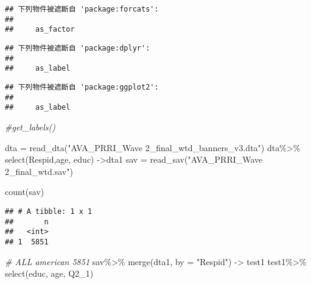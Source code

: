 \documentclass[
]{article}
\newenvironment{Shaded}{\begin{snugshade}}{\end{snugshade}}
\newcommand{\AttributeTok}[1]{\textcolor[rgb]{0.77,0.63,0.00}{#1}}
\newcommand{\CommentTok}[1]{\textcolor[rgb]{0.56,0.35,0.01}{\textit{#1}}}
\newcommand{\FunctionTok}[1]{\textcolor[rgb]{0.00,0.00,0.00}{#1}}
\newcommand{\NormalTok}[1]{#1}
\newcommand{\OtherTok}[1]{\textcolor[rgb]{0.56,0.35,0.01}{#1}}
\newcommand{\SpecialCharTok}[1]{\textcolor[rgb]{0.00,0.00,0.00}{#1}}
\newcommand{\StringTok}[1]{\textcolor[rgb]{0.31,0.60,0.02}{#1}}
\begin{document}
\begin{verbatim}
## 下列物件被遮斷自 'package:forcats':
## 
##     as_factor
\end{verbatim}

\begin{verbatim}
## 下列物件被遮斷自 'package:dplyr':
## 
##     as_label
\end{verbatim}

\begin{verbatim}
## 下列物件被遮斷自 'package:ggplot2':
## 
##     as_label
\end{verbatim}

\begin{Shaded}
\begin{Highlighting}[]
\CommentTok{\#get\_labels()}
\end{Highlighting}
\end{Shaded}

\begin{Shaded}
\begin{Highlighting}[]
\NormalTok{dta }\OtherTok{=} \FunctionTok{read\_dta}\NormalTok{(}\StringTok{"AVA\_PRRI\_Wave 2\_final\_wtd\_banners\_v3.dta"}\NormalTok{)}
\NormalTok{dta}\SpecialCharTok{\%\textgreater{}\%}
  \FunctionTok{select}\NormalTok{(Respid,age, educ) }\OtherTok{{-}\textgreater{}}\NormalTok{dta1}
\NormalTok{sav }\OtherTok{=} \FunctionTok{read\_sav}\NormalTok{(}\StringTok{"AVA\_PRRI\_Wave 2\_final\_wtd.sav"}\NormalTok{)}
\end{Highlighting}
\end{Shaded}

\begin{Shaded}
\begin{Highlighting}[]
\FunctionTok{count}\NormalTok{(sav)}
\end{Highlighting}
\end{Shaded}

\begin{verbatim}
## # A tibble: 1 x 1
##       n
##   <int>
## 1  5851
\end{verbatim}

\begin{Shaded}
\begin{Highlighting}[]
\CommentTok{\# ALL american 5851}
\NormalTok{sav}\SpecialCharTok{\%\textgreater{}\%}
  \FunctionTok{merge}\NormalTok{(dta1, }\AttributeTok{by =} \StringTok{"Respid"}\NormalTok{) }\OtherTok{{-}\textgreater{}}\NormalTok{ test1}
\NormalTok{test1}\SpecialCharTok{\%\textgreater{}\%}
\FunctionTok{select}\NormalTok{(educ, age, Q2\_1)}
\end{Highlighting}
\end{Shaded}
\end{document}
